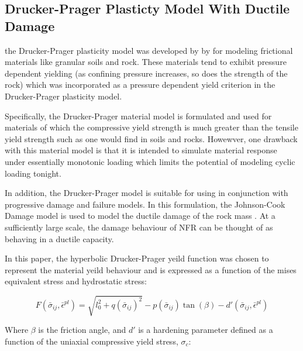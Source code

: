 \subsection{Drucker-Prager Plasticty Model With Ductile Damage}

the Drucker-Prager plasticity model was developed by by \citet{drucker_implications_1950} for modeling frictional materials like granular soils and rock. These materials tend  to exhibit pressure dependent yielding (as confining
pressure increases, so does the strength of the rock) which was incorporated as a pressure dependent yield criterion in the Drucker-Prager plasticity model. 

Specifically, the Drucker-Prager material model is formulated and used for materials of which the compressive yield strength is much greater than the tensile yield strength such as one would find in soils and rocks. Howewver, one drawback with this material model is that it is intended to simulate material response under essentially monotonic loading which limits the potential of modeling cyclic loading tonight.

In addition, the Drucker-Prager model is suitable for using in conjunction with progressive damage and failure models. In this formulation, the Johnson-Cook Damage model is used to model the ductile damage of the rock mass \cite{johnson_fracture_1985}. At a sufficiently large scale, the damage behaviour of NFR can be thought of as behaving in a ductile capacity. 




In this paper, the hyperbolic Drucker-Prager yeild function was chosen to represent the material yeild behaviour and is expressed as a function of the mises equivalent stress and hydrostatic stress:

\begin{equation}
F\left(\bar{\sigma}_{ij}, \bar{\epsilon}^{pl}\right)=\sqrt{l_{0}^{2}+q\left(\bar{\sigma}_{ij}\right)^{2}}-p\left(\bar{\sigma}_{ij}\right)\tan\left(\beta\right)-d'\left(\bar{\sigma}_{ij}, \bar{\epsilon}^{pl}\right)\label{eqn:druc2}
\end{equation}

Where $\beta$ is the friction angle, and $d'$ is a hardening parameter defined as a function of the uniaxial compressive yield stress, $\sigma_c$:

